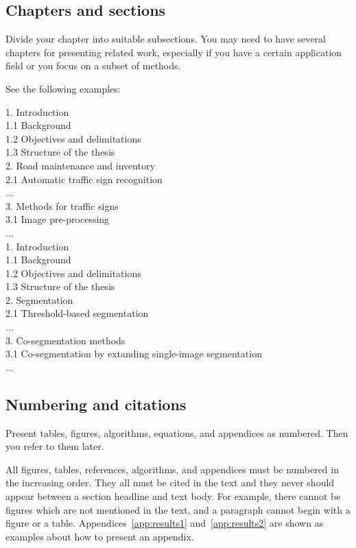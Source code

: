 \documentclass{lutmscthesis}[2017/10/03]
\begin{document}
\subsection{Chapters and sections}

Divide your chapter into suitable subsections. You may need to have several chapters for presenting related work, 
especially if you have a certain application field or you focus on a subset of methods.

See the following examples: 

1. Introduction\\
1.1 Background\\
1.2 Objectives and delimitations\\
1.3 Structure of the thesis\\
2. Road maintenance and inventory \\
2.1 Automatic traffic sign recognition\\
...\\
3. Methods for traffic signs\\
3.1 Image pre-processing\\
...\\

1. Introduction\\
1.1 Background\\
1.2 Objectives and delimitations\\
1.3 Structure of the thesis\\
2. Segmentation \\
2.1 Threshold-based segmentation\\
...\\
3. Co-segmentation methods \\
3.1 Co-segmentation by extanding single-image segmentation\\
...\\

\subsection{Numbering and citations}

Present tables, figures, algorithms, equations, and appendices as numbered. Then you refer to them later. 

All figures, tables, references, algorithms, and appendices must be numbered in the increasing order. 
They all must be cited in the text and they never should appear between a section headline and text body. 
For example, there cannot be figures which are not mentioned in the text, and a paragraph cannot begin with a figure or a table. 
Appendices~\ref{app:results1} and~\ref{app:results2} are shown as examples about how to present an appendix.  
\end{document}
